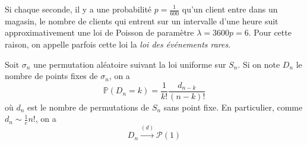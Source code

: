 
  \begin{example}
    Si chaque seconde, il y a une probabilité $p = \frac{1}{600}$ qu'un client entre dans un magasin, le nombre de clients qui entrent sur un intervalle d'une heure suit approximativement une loi de Poisson de paramètre $\lambda = 3600p = 6$.
    \newpar
    Pour cette raison, on appelle parfois cette loi la \textit{loi des événements rares}.
  \end{example}


  \begin{application}
    Soit $\sigma_n$ une permutation aléatoire suivant la loi uniforme sur $S_n$. Si on note $D_n$ le nombre de points fixes de $\sigma_n$, on a
    \[ \mathbb{P}(D_n = k) = \frac{1}{k!} \frac{d_{n-k}}{(n-k)!} \]
    où $d_n$ est le nombre de permutations de $S_n$ sans point fixe. En particulier, comme $d_n \sim \frac{1}{e} n!$, on a
    \[ D_n \overset{(d)}{\longrightarrow} \mathcal{P}(1) \]
  \end{application}

